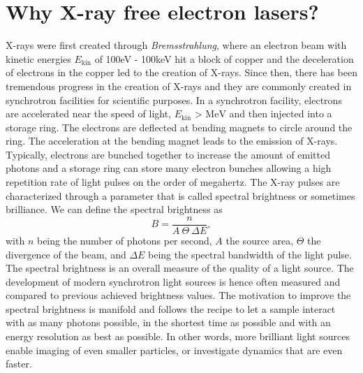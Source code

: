 \section{Why X-ray free electron lasers?}\label{sec:xfel}
X-rays were first created through \textit{Bremsstrahlung}, where an electron beam with kinetic energies $E_{\text{kin}}$ of 100eV - 100keV hit a block of copper and the deceleration of electrons in the copper led to the creation of X-rays. Since then, there has been tremendous progress in the creation of X-rays and they are commonly created in synchrotron facilities for scientific purposes. In a synchrotron facility, electrons are accelerated near the speed of light, $E_{\text{kin}}\text{ > MeV}$ and then injected into a storage ring. The electrons are deflected at bending magnets to circle around the ring. The acceleration at the bending magnet leads to the emission of X-rays. Typically, electrons are bunched together to increase the amount of emitted photons and a storage ring can store many electron bunches allowing a high repetition rate of light pulses on the order of megahertz. The X-ray pulses are characterized through a parameter that is called spectral brightness \cite{Mills-2005-IUCR} or sometimes brilliance. We can define the spectral brightness as \cite{Als-Nielson-2011-JWS}
\begin{equation}
B = \frac{n}{A\ \Theta\ \Delta\! E},
\label{eq:spectral-brightness}
\end{equation}
with $n$ being the number of photons per second, $A$ the source area, $\Theta$ the divergence of the beam, and $\Delta\! E$ being the spectral bandwidth of the light pulse. The spectral brightness is an overall measure of the quality of a light source. The development of modern synchrotron light sources is hence often measured and compared to previous achieved brightness values. The motivation to improve the spectral brightness is manifold and follows the recipe to let a sample interact with as many photons possible, in the shortest time as possible and with an energy resolution as best as possible. In other words, more brilliant light sources enable imaging of even smaller particles, or investigate dynamics that are even faster.
